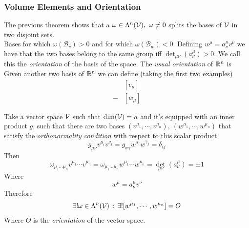 \documentclass[../complete.tex]{subfiles}
\begin{document}
\subsubsection{Volume Elements and Orientation}
\begin{dfn}[Orientation]
	The previous theorem shows that a $\omega\in\Lambda^n(\mathcal{V}),\ \omega\ne0$ splits the bases of $\mathcal{V}$ in two disjoint sets.\\
	Bases for which $\omega(\mathcal{B}_v)>0$ and for which $\omega(\mathcal{B}_w)<0$. Defining $w^{\mu}=a^\mu_\nu v^\nu$ we have that the two bases belong to the same group iff $\det_{\mu\nu}(a^\mu_\nu)>0$. We call this the \textit{orientation} of the basis of the space. The \textit{usual orientation} of $\mathbb{R}^n$ is
	\begin{equation*}
		[e_\mu]
	\end{equation*}
	Given another two basis of $\mathbb{R}^n$ we can define (taking the first two examples)
	\begin{equation*}
		\begin{aligned}
			&[v_\mu]\\
			-&[w_\mu]
		\end{aligned}
	\end{equation*}
\end{dfn}
\begin{dfn}
	Take a vector space $\mathcal{V}$ such that $\dim(\mathcal{V})=n$ and it's equipped with an inner product $g$, such that there are two bases $(v^{\mu_1},\cdots,v^{\mu_n}),\ (w^{\mu_1},\cdots,w^{\mu_n})$ that satisfy the \textit{orthonormality condition} with respect to this scalar product
	\begin{equation}
		g_{\mu\nu}v^{\mu_i} v^{\nu_j}=g_{\sigma\gamma}w^{\sigma_i} w^{\gamma_j}=\delta_{ij}
		\label{eq:boncond}
	\end{equation}
	Then
	\begin{equation*}
		\omega_{\mu_1\ldots\mu_n}v^{\mu_1}\cdots v^{\mu_n}=\omega_{\mu_1\ldots\mu_n}w^{\mu_1}\cdots w^{\mu_n}=\det_{\mu\nu}(a^\mu_\nu)=\pm 1
	\end{equation*}
	Where
	\begin{equation*}
		w^\mu=a^\mu_\nu v^\nu
	\end{equation*}
	Therefore
	\begin{equation*}
		\exists!\omega\in\Lambda^n(\mathcal{V})\, :\, \exists![w^{\mu_1},\cdots,w^{\mu_n}]=O
	\end{equation*}
	Where $O$ is the \textit{orientation} of the vector space.
\end{dfn}
\end{document}

